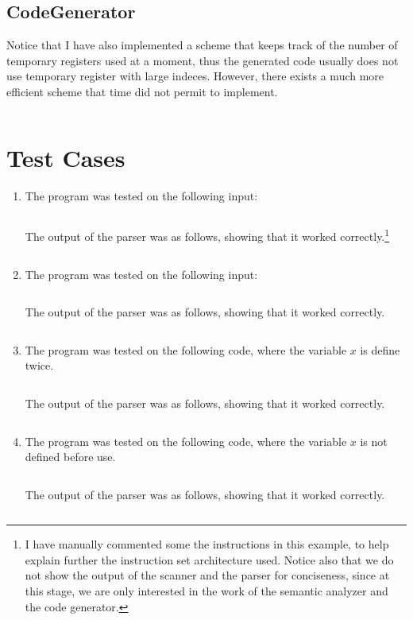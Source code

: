 \documentclass[12pt]{article}
\begin{document}
\subsection{CodeGenerator}
Notice that I have also implemented a scheme that keeps track of the number of temporary registers used at a moment, thus the generated code usually does not use temporary register with large indeces. However, there exists a much more efficient scheme that time did not permit to implement.
\inputminted[xleftmargin = -40pt, xrightmargin = -40pt, frame = single, linenos]{java}{src/CodeGenerator.java}
\section{Test Cases}
\begin{enumerate}[label = \Roman*.]
\item The program was tested on the following input:
\inputminted[xleftmargin = -20pt, xrightmargin = -20pt, frame = single, linenos]{c}{samples/input_0.c}
The output of the parser was as follows, showing that it worked correctly.\footnote{I have manually commented some the instructions in this example, to help explain further the instruction set architecture used. Notice also that we do not show the output of the scanner and the parser for conciseness, since at this stage, we are only interested in the work of the semantic analyzer and the code generator.}
\inputminted[xleftmargin = -20pt, xrightmargin = -20pt, frame = single, linenos]{python}{samples/output_0.txt}

\item The program was tested on the following input:
\inputminted[xleftmargin = -20pt, xrightmargin = -20pt, frame = single, linenos]{c}{samples/input_3.c}
The output of the parser was as follows, showing that it worked correctly.
\inputminted[xleftmargin = -20pt, xrightmargin = -20pt, frame = single, linenos]{python}{samples/output_3.txt}

\item The program was tested on the following code, where the variable $x$ is define twice.
\inputminted[xleftmargin = -20pt, xrightmargin = -20pt, frame = single, linenos]{c}{samples/input_1.c}
The output of the parser was as follows, showing that it worked correctly.
\inputminted[xleftmargin = -20pt, xrightmargin = -20pt, frame = single, linenos]{python}{samples/output_1.txt}

\item The program was tested on the following code, where the variable $x$ is not defined before use.
\inputminted[xleftmargin = -20pt, xrightmargin = -20pt, frame = single, linenos]{c}{samples/input_2.c}
The output of the parser was as follows, showing that it worked correctly.
\inputminted[xleftmargin = -20pt, xrightmargin = -20pt, frame = single, linenos]{python}{samples/output_2.txt}


\end{enumerate}
\end{document}
